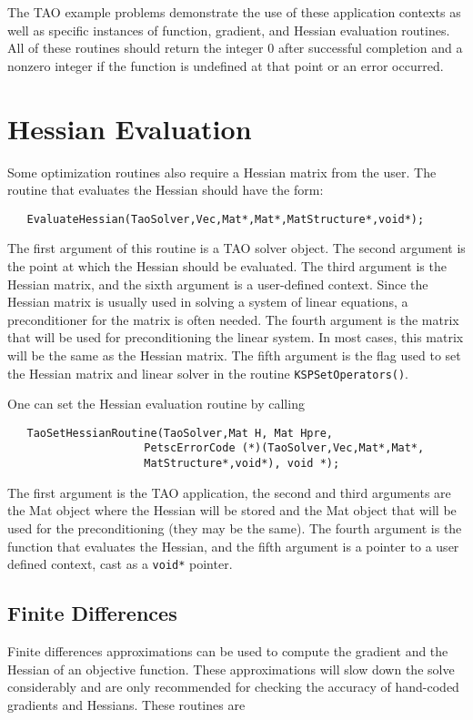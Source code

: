 The TAO example problems demonstrate the use of these application contexts
as well as specific instances of function, gradient, and Hessian 
evaluation routines.
All of these routines should return the integer $0$ after 
successful completion and a nonzero integer if the function
is undefined at that point or an error occurred.

\section{Hessian Evaluation}
\label{sec:matrixfree}
\label{sec:finitedifference}

Some optimization routines also require a Hessian matrix from the user.
The routine that evaluates the Hessian should have the form:
\begin{verbatim}
   EvaluateHessian(TaoSolver,Vec,Mat*,Mat*,MatStructure*,void*);
\end{verbatim}
\noindent
The first argument of this routine is a TAO solver object.  The second
argument is the point at which the Hessian should be evaluated.  The
third argument is the Hessian matrix, and the sixth argument is a
user-defined context.
Since the Hessian matrix is usually used in solving
a system of linear equations, a preconditioner for the matrix is often
needed.  The fourth argument is the matrix that will be used
for preconditioning the linear system.  In most cases, this
matrix will be the same as the Hessian matrix.  The fifth
argument is the flag used to set the Hessian matrix and
linear solver in the routine {\tt KSPSetOperators()}.

One can set the Hessian evaluation routine by calling 
\begin{verbatim}
   TaoSetHessianRoutine(TaoSolver,Mat H, Mat Hpre,
                     PetscErrorCode (*)(TaoSolver,Vec,Mat*,Mat*,
                     MatStructure*,void*), void *);
\end{verbatim}
\noindent
The first argument is the TAO application, the second and third arguments
are the Mat object where the Hessian will be stored and the Mat object
that will be used for the preconditioning (they may be the same). The fourth 
argument is the function that evaluates the Hessian, 
and the fifth argument is a pointer to a user defined context,
cast as a {\tt void*} pointer.

\subsection{Finite Differences} 
Finite differences approximations can be used to compute the gradient and the
Hessian of an objective
function.  These approximations will slow down the solve considerably and are only 
recommended for checking the accuracy of hand-coded gradients and Hessians.
These routines are 

